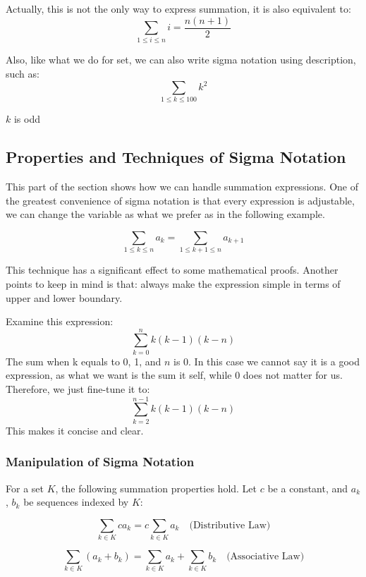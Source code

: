 Actually, this is not the only way to express summation, it is also equivalent to:
\[\sum_{1\leq i\leq n} i = \frac{n(n+1)}{2}\]

Also, like what we do for set, we can also write sigma notation using description, such as: 
\[
\sum_{1 \leq k \leq 100} k^2
\]

\( k \) is odd

\subsection{Properties and Techniques of Sigma Notation}
This part of the section shows how we can handle summation expressions.
One of the greatest convenience of sigma notation is that every expression is adjustable, we can change the variable as what we prefer as in the following example.
\begin{example} \label{exp:siginvariance}
 \[
\sum_{1 \leq k \leq n} a_k = \sum_{1 \leq k+1 \leq n} a_{k+1}
\]
\end{example}
This technique has a significant effect to some mathematical proofs.
Another points to keep in mind is that: always make the expression simple in terms of upper and lower boundary.
\begin{example}
    Examine this expression: 
    \[\sum_{k=0}^{n} k(k-1)(k-n)\]
    The sum when k equals to 0, 1, and $n$ is 0. In this case we cannot say it is a good expression, as what we want is the sum it self, while 0 does not matter for us. Therefore, we just fine-tune it to:
    \[\sum_{k=2}^{n-1} k(k-1)(k-n)\]
    This makes it concise and clear.
\end{example}

\subsubsection{Manipulation of Sigma Notation}
For a set \( K \), the following summation properties hold. Let \( c \) be a constant, and \( a_k \), \( b_k \) be sequences indexed by \( K \):

\begin{equation}
    \sum_{k \in K} c a_k = c \sum_{k \in K} a_k \quad \text{(Distributive Law)}
    \label{eq:constant_factor}
\end{equation}

\begin{equation}
    \sum_{k \in K} (a_k + b_k) = \sum_{k \in K} a_k + \sum_{k \in K} b_k \quad \text{(Associative Law)}
    \label{eq:summation_of_sums}
\end{equation}

